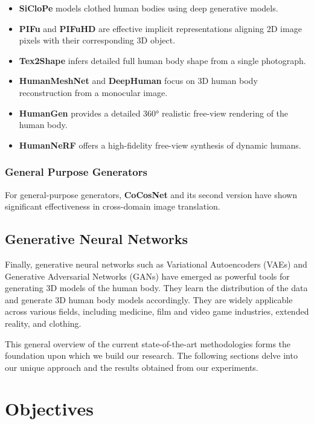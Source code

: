 \begin{itemize}
	\item \textbf{SiCloPe} \cite{SiCloPe} models clothed human bodies using deep generative models.
	\item \textbf{PIFu} and \textbf{PIFuHD} \cite{PIFu, PIFuHD} are effective implicit representations aligning 2D image pixels with their corresponding 3D object.
	\item \textbf{Tex2Shape} \cite{Tex2Shape} infers detailed full human body shape from a single photograph.
	\item \textbf{HumanMeshNet} \cite{HumanMeshNet} and \textbf{DeepHuman} \cite{DeepHuman} focus on 3D human body reconstruction from a monocular image.
	\item \textbf{HumanGen} \cite{humangen} provides a detailed 360° realistic free-view rendering of the human body.
	\item \textbf{HumanNeRF} \cite{humannerf} offers a high-fidelity free-view synthesis of dynamic humans.
\end{itemize}

\subsubsection{General Purpose Generators}

For general-purpose generators, \textbf{CoCosNet} and its second version
\cite{CoCosNet, CoCosNet2} have shown significant effectiveness in cross-domain
image translation.

\subsection{Generative Neural Networks}

Finally, generative neural networks such as Variational Autoencoders (VAEs) and
Generative Adversarial Networks (GANs) have emerged as powerful tools for
generating 3D models of the human body. They learn the distribution of the data
and generate 3D human body models accordingly. They are widely applicable
across various fields, including medicine, film and video game industries,
extended reality, and clothing.

This general overview of the current state-of-the-art methodologies forms the
foundation upon which we build our research. The following sections delve into
our unique approach and the results obtained from our experiments.

\section{Objectives}\label{objectives}

